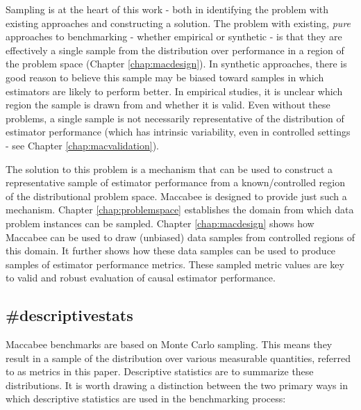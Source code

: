 \documentclass[./main.tex]{subfiles}
\begin{document}
Sampling is at the heart of this work - both in identifying the problem with existing approaches and constructing a solution. The problem with existing, \textit{pure} approaches to benchmarking - whether empirical or synthetic - is that they are effectively a single sample from the distribution over performance in a region of the problem space (Chapter \ref{chap:macdesign}). In synthetic approaches, there is good reason to believe this sample may be biased toward samples in which estimators are likely to perform better. In empirical studies, it is unclear which region the sample is drawn from and whether it is valid. Even without these problems, a single sample is not necessarily representative of the distribution of estimator performance (which has intrinsic variability, even in controlled settings - see Chapter \ref{chap:macvalidation}).

\vspace{\baselineskip}

The solution to this problem is a mechanism that can be used to construct a representative sample of estimator performance from a known/controlled region of the distributional problem space. Maccabee is designed to provide just such a mechanism. Chapter \ref{chap:problemspace} establishes the domain from which data problem instances can be sampled. Chapter \ref{chap:macdesign} shows how Maccabee can be used to draw (unbiased) data samples from controlled regions of this domain. It further shows how these data samples can be used to produce samples of estimator performance metrics. These sampled metric values are key to valid and robust evaluation of causal estimator performance.


\subsection*{\textbf{\#descriptivestats}}
\label{hc:descriptivestats}

Maccabee benchmarks are based on Monte Carlo sampling. This means they result in a sample of the distribution over various measurable quantities, referred to as metrics in this paper. Descriptive statistics are to summarize these distributions. It is worth drawing a distinction between the two primary ways in which descriptive statistics are used in the benchmarking process:
\end{document}
